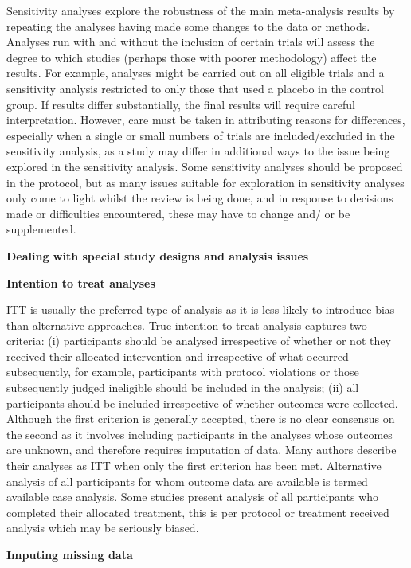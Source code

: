 \documentclass[
  11pt,
  a4paper,
  DIV=11,
  numbers=noendperiod]{scrreprt}
\begin{document}
Sensitivity analyses explore the robustness of the main meta-analysis
results by repeating the analyses having made some changes to the data
or methods. Analyses run with and without the inclusion of certain
trials will assess the degree to which studies (perhaps those with
poorer methodology) affect the results. For example, analyses might be
carried out on all eligible trials and a sensitivity analysis restricted
to only those that used a placebo in the control group. If results
differ substantially, the final results will require careful
interpretation. However, care must be taken in attributing reasons for
differences, especially when a single or small numbers of trials are
included/excluded in the sensitivity analysis, as a study may differ in
additional ways to the issue being explored in the sensitivity analysis.
Some sensitivity analyses should be proposed in the protocol, but as
many issues suitable for exploration in sensitivity analyses only come
to light whilst the review is being done, and in response to decisions
made or difficulties encountered, these may have to change and/ or be
supplemented.

\textbf{Dealing with special study designs and analysis issues}

\textbf{Intention to treat analyses}

ITT is usually the preferred type of analysis as it is less likely to
introduce bias than alternative approaches. True intention to treat
analysis captures two criteria: (i) participants should be analysed
irrespective of whether or not they received their allocated
intervention and irrespective of what occurred subsequently, for
example, participants with protocol violations or those subsequently
judged ineligible should be included in the analysis; (ii) all
participants should be included irrespective of whether outcomes were
collected. Although the first criterion is generally accepted, there is
no clear consensus on the second as it involves including participants
in the analyses whose outcomes are unknown, and therefore requires
imputation of data. Many authors describe their analyses as ITT when
only the first criterion has been met. Alternative analysis of all
participants for whom outcome data are available is termed available
case analysis. Some studies present analysis of all participants who
completed their allocated treatment, this is per protocol or treatment
received analysis which may be seriously biased.

\textbf{Imputing missing data}
\end{document}
